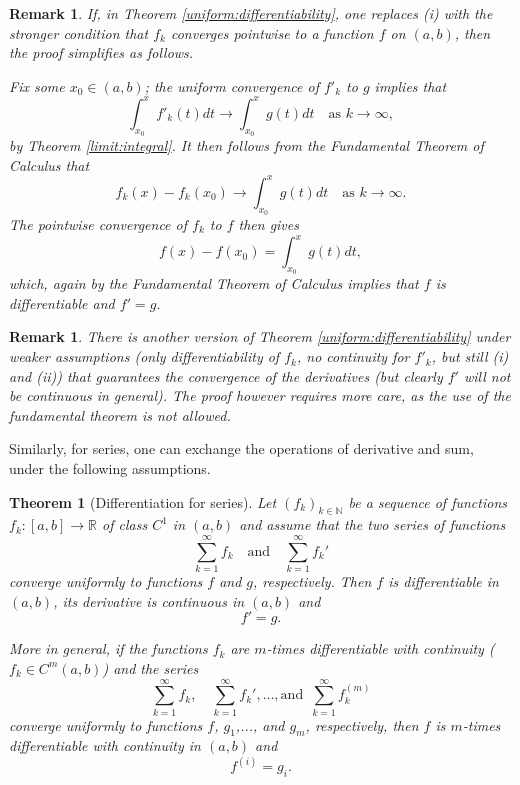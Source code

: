 \documentclass[a4paper,reqno]{amsart}
\numberwithin{equation}{section}
\newtheorem{theorem}[definition]{Theorem}
\newtheorem{remark}[definition]{Remark}
\def\N{\mathbb{N}}
\def\R{\mathbb{R}}
\begin{document}
\begin{remark}
If, in Theorem \ref{uniform:differentiability}, one replaces (i) with the stronger condition that $f_k$ converges pointwise to a function $f$ on $(a,b)$, then the proof simplifies as follows.

Fix some $x_0\in (a,b)$; the uniform convergence of $f'_k$ to $g$ implies that 
$$
\int_{x_0}^x f'_k(t) dt \to \int_{x_0}^x g(t) dt \quad \textrm{as } k\to \infty,
$$
by Theorem \ref{limit:integral}. It then follows from the Fundamental Theorem of Calculus that 
$$
f_k(x) - f_k(x_0) \to  \int_{x_0}^x g(t) dt \quad \textrm{as } k\to \infty.
$$
The pointwise convergence of $f_k$ to $f$ then gives
$$
f(x) - f(x_0) =  \int_{x_0}^x g(t) dt,
$$
which, again by the Fundamental Theorem of Calculus implies that $f$ is differentiable and $f'=g$.

\end{remark}

\begin{remark}
There is another version of Theorem \ref{uniform:differentiability} under weaker assumptions (only differentiability of $f_k$, no continuity for $f'_k$, but still (i) and (ii)) that guarantees the convergence of the derivatives (but clearly $f'$ will not be continuous in general). The proof however requires more care, as the use of the fundamental theorem is not allowed.
\end{remark}


Similarly, for series, one can exchange the operations of derivative and sum, under the following assumptions.

\begin{theorem}[Differentiation for series]\label{series:d}
Let $(f_k)_{k\in \N}$ be a sequence of functions $f_k:[a,b]\to \R$ of class $C^1$ in $(a,b)$ and assume that the two series of functions 
$$
\sum_{k=1}^\infty f_k \quad \textrm{and} \quad \sum_{k=1}^\infty f_k'
$$
converge uniformly to functions $f$ and $g$, respectively. Then $f$ is differentiable in $(a,b)$, its derivative is continuous in $(a,b)$ and 
$$
f'=g.
$$

More in general, if the functions $f_k$ are $m$-times differentiable with continuity ($f_k\in C^m(a,b)$) and the series 
$$
\sum_{k=1}^\infty f_k, \quad \sum_{k=1}^\infty f_k',  \dots , \textrm{and }  \, \sum_{k=1}^\infty f_k^{(m)}
$$
converge uniformly to functions $f$, $g_1$,..., and $g_m$, respectively, then $f$ is $m$-times differentiable with continuity in $(a,b)$ and 
$$
f^{(i)}=g_i.
$$
\end{theorem}
\end{document}
